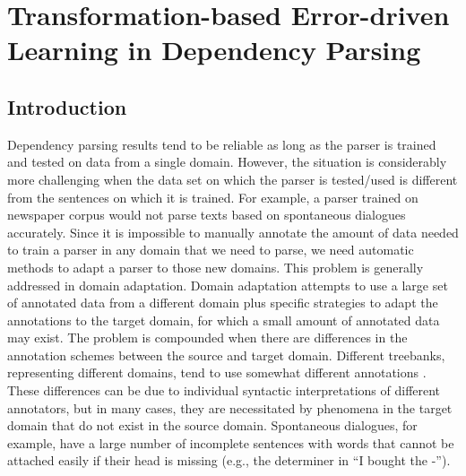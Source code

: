 \chapter{Transformation-based Error-driven Learning in Dependency Parsing}

\section{Introduction}
\label{sc:main}

Dependency parsing results tend to be reliable as long as the parser is trained and tested on data from a single domain. However, the situation is considerably more challenging when the data set on which the parser is tested/used is different from the sentences on which it is trained. For example, a parser trained on newspaper corpus would not parse texts based on spontaneous dialogues accurately. Since it is impossible to manually annotate the amount of data needed to train a parser in any domain that we need to parse, we need automatic methods to adapt a parser to those new domains. %
This problem is generally addressed in domain adaptation. Domain adaptation attempts to use a large set of annotated data from a different domain plus specific strategies to adapt the annotations to the target domain, for which a small amount of annotated data may exist. The problem is compounded when there are differences in the annotation schemes between the source and target domain. Different treebanks, representing different domains, tend to  use somewhat different annotations \cite{dredze2007frustratingly}. These differences can be due to individual syntactic interpretations of different annotators, but in many cases, they are necessitated by phenomena in the target domain that do not exist in the source domain. Spontaneous dialogues, for example, have a large number of incomplete sentences with words that cannot be attached easily if their head is missing (e.g., the determiner in ``I bought the -'').

